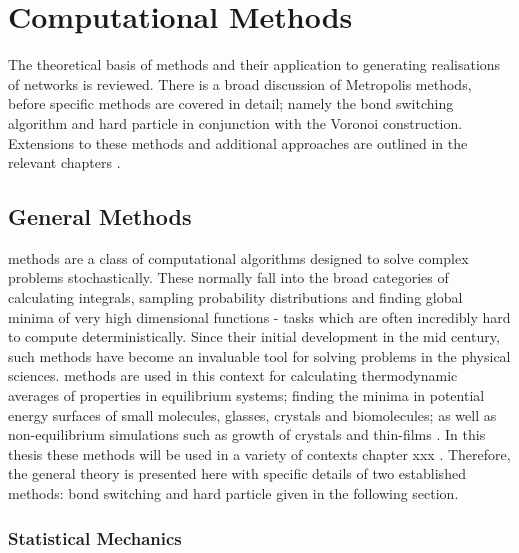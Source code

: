 \chapter{Computational Methods}
\label{ch:compmethods}

\begin{chapterabstract}
The theoretical basis of \mc{} methods and their application to generating realisations of \td{} networks is reviewed.
There is a broad discussion of Metropolis \mc{} methods, before specific methods are covered in detail; namely the bond switching algorithm and hard particle \mc{} in conjunction with the Voronoi construction.
Extensions to these methods and additional approaches are outlined in the relevant chapters .
\end{chapterabstract}

\section{General \mc{} Methods}
\label{sec:mc}

\mc{} methods are a class of computational algorithms designed to solve complex problems stochastically.
These normally fall into the broad categories of calculating integrals, sampling probability distributions and finding global minima of very high dimensional functions \-- tasks which are often incredibly hard to compute deterministically.
Since their initial development in the mid\th{} century, such methods have become an invaluable tool for solving problems in the physical sciences.
\mc{} methods are used in this context for calculating thermodynamic averages of properties in equilibrium systems; finding the minima in potential energy surfaces of small molecules, glasses, crystals and biomolecules; as well as non\--equilibrium simulations such as growth of crystals and thin\--films \cite{Landau2014,Wales1999,Levi1997,Ratsch2003,Kob1999,Jensen1999}.
In this thesis these \mc{} methods  will be used in a variety of contexts chapter xxx .
Therefore, the general theory is presented here with specific details of two established methods: bond switching and hard particle \mc{} given in the following section.

\subsection{Statistical Mechanics}

